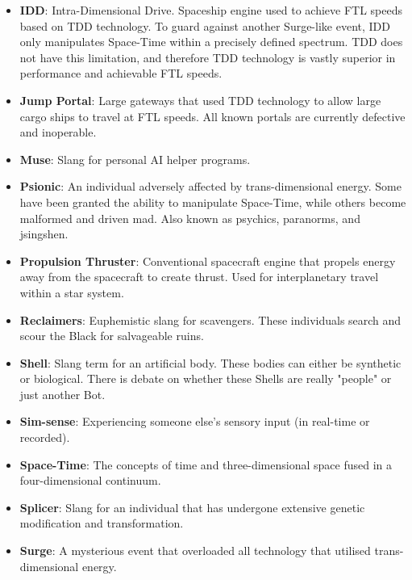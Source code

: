 \documentclass[10pt,twoside]{article}
\begin{document}
\begin{multicols}{2}
\begin{itemize}
    \item \textbf{IDD}: Intra-Dimensional Drive. Spaceship engine used to achieve FTL speeds based on TDD technology. To guard against another Surge-like event, IDD only manipulates Space-Time within a precisely defined spectrum. TDD does not have this limitation, and therefore TDD technology is vastly superior in performance and achievable FTL speeds.

    \item \textbf{Jump Portal}: Large gateways that used TDD technology to allow large cargo ships to travel at FTL speeds. All known portals are currently defective and inoperable.

    \item \textbf{Muse}: Slang for personal AI helper programs.

    \item \textbf{Psionic}: An individual adversely affected by trans-dimensional energy. Some have been granted the ability to manipulate Space-Time, while others become malformed and driven mad. Also known as psychics, paranorms, and jsingshen.

    \item \textbf{Propulsion Thruster}: Conventional spacecraft engine that propels energy away from the spacecraft to create thrust. Used for interplanetary travel within a star system.

    \item \textbf{Reclaimers}: Euphemistic slang for scavengers. These individuals search and scour the Black for salvageable ruins.

    \item \textbf{Shell}: Slang term for an artificial body. These bodies can either be synthetic or biological. There is debate on whether these Shells are really "people" or just another Bot.

    \item \textbf{Sim-sense}: Experiencing someone else's sensory input (in real-time or recorded).

    \item \textbf{Space-Time}: The concepts of time and three-dimensional space fused in a four-dimensional continuum.

    \item \textbf{Splicer}: Slang for an individual that has undergone extensive genetic modification and transformation.

    \item \textbf{Surge}: A mysterious event that overloaded all technology that utilised trans-dimensional energy.


\end{itemize}
\end{multicols}
\end{document}

